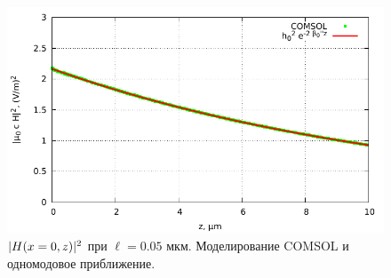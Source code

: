 \begin{figure}
    \centering
    \includegraphics[width=\textwidth]{figures/Hz_005.pdf}
    \caption{$\lvert H(x=0,z)\rvert^2$ при $\ell=0.05$ мкм. Моделирование COMSOL и одномодовое приближение.}
    \label{fig:Hz_005}
\end{figure}

